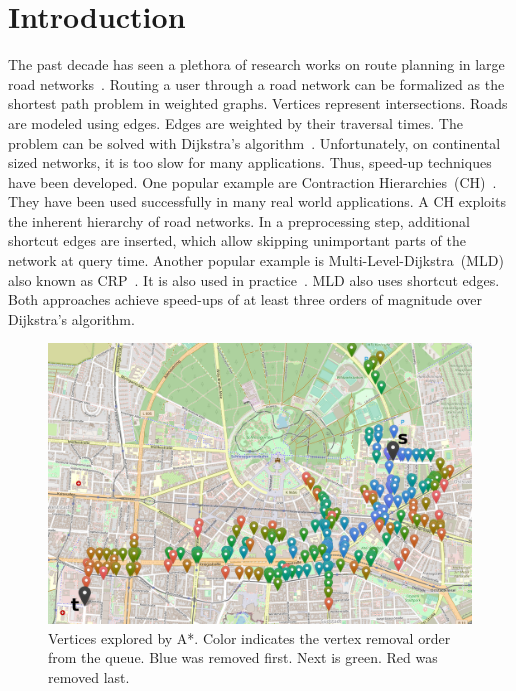 \documentclass[manuscript,review]{acmart}
\begin{document}


\maketitle

\section{Introduction}
\label{sec:intro}
The past decade has seen a plethora of research works on route planning in large road networks~\cite{bdgmpsww-rptn-16}.
Routing a user through a road network can be formalized as the shortest path problem in weighted graphs.
Vertices represent intersections.
Roads are modeled using edges.
Edges are weighted by their traversal times.
The problem can be solved with Dijkstra's algorithm~\cite{d-ntpcg-59}.
Unfortunately, on continental sized networks, it is too slow for many applications.
Thus, speed-up techniques have been developed.
One popular example are Contraction Hierarchies~(CH)~\cite{gssv-erlrn-12}.
They have been used successfully in many real world applications.
A CH exploits the inherent hierarchy of road networks.
In a preprocessing step, additional shortcut edges are inserted, which allow skipping unimportant parts of the network at query time.
Another popular example is Multi-Level-Dijkstra~(MLD)~\cite{swz-umlgt-02} also known as CRP~\cite{dgpw-crprn-13}.
It is also used in practice~\cite{bingblog}.
MLD also uses shortcut edges.
Both approaches achieve speed-ups of at least three orders of magnitude over Dijkstra's algorithm.

\begin{figure}
\centering
\includegraphics[width=.6\columnwidth]{fig/searchspace_st.png}
\caption{Vertices explored by A*. Color indicates the vertex removal order from the queue. Blue was removed first. Next is green. Red was removed last.}
\label{img:search-space}
\end{figure}
\end{document}
